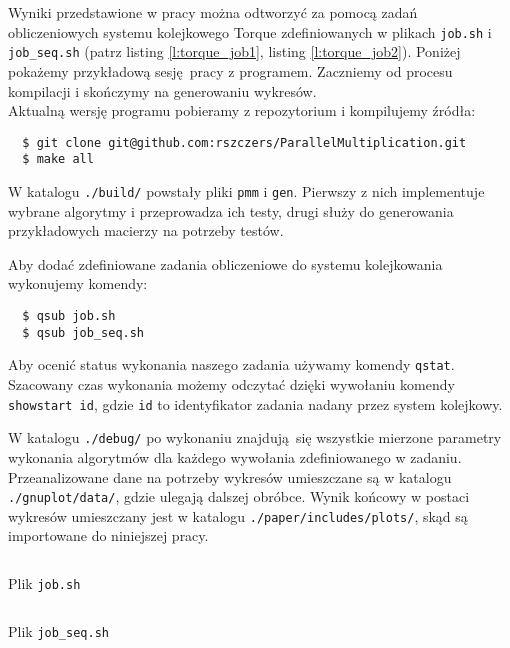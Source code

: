Wyniki przedstawione w pracy można odtworzyć za pomocą zadań obliczeniowych systemu kolejkowego Torque zdefiniowanych w plikach \texttt{job.sh} i \texttt{job\_seq.sh} (patrz listing \ref{l:torque_job1}, listing \ref{l:torque_job2}). Poniżej pokażemy przykładową sesję pracy z programem. Zaczniemy od procesu kompilacji i skończymy na generowaniu wykresów.\\

Aktualną wersję programu pobieramy z repozytorium i kompilujemy źródła:
\begin{verbatim}
  $ git clone git@github.com:rszczers/ParallelMultiplication.git
  $ make all
\end{verbatim}

\noindent W katalogu \texttt{./build/} powstały pliki \texttt{pmm} i \texttt{gen}. Pierwszy z nich implementuje wybrane algorytmy i przeprowadza ich testy, drugi służy do generowania przykładowych macierzy na potrzeby testów.

Aby dodać zdefiniowane zadania obliczeniowe do systemu kolejkowania wykonujemy komendy:
\begin{verbatim}
  $ qsub job.sh
  $ qsub job_seq.sh
\end{verbatim}

Aby ocenić status wykonania naszego zadania używamy komendy \texttt{qstat}. Szacowany czas wykonania możemy odczytać dzięki wywołaniu komendy\\ \texttt{showstart id}, gdzie \texttt{id} to identyfikator zadania nadany przez system kolejkowy.


W katalogu \texttt{./debug/} po wykonaniu znajdują się wszystkie mierzone parametry wykonania algorytmów dla każdego wywołania zdefiniowanego w zadaniu. Przeanalizowane dane na potrzeby wykresów umieszczane są w katalogu \texttt{./gnuplot/data/}, gdzie ulegają dalszej obróbce. Wynik końcowy w postaci wykresów umieszczany jest w katalogu \texttt{./paper/includes/plots/}, skąd są importowane do niniejszej pracy.

\begin{listing}[H]
\inputminted[fontsize=\footnotesize,bgcolor=bg]{bash}{includes/listings/job.sh}
\caption{Plik \texttt{job.sh}}
\label{l:torque_job1}
\end{listing}

\begin{listing}[H]
\footnotesize
\inputminted[fontsize=\footnotesize,bgcolor=bg]{bash}{includes/listings/job_seq.sh}
\caption{Plik \texttt{job\_seq.sh}}
\label{l:torque_job2}
\end{listing}



